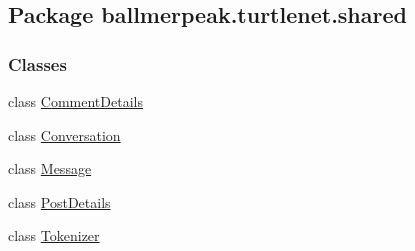 \hypertarget{namespaceballmerpeak_1_1turtlenet_1_1shared}{\subsection{Package ballmerpeak.\-turtlenet.\-shared}
\label{namespaceballmerpeak_1_1turtlenet_1_1shared}
}
\subsubsection*{Classes}
\begin{DoxyCompactItemize}
\item 
class \hyperlink{classballmerpeak_1_1turtlenet_1_1shared_1_1CommentDetails}{Comment\-Details}
\item 
class \hyperlink{classballmerpeak_1_1turtlenet_1_1shared_1_1Conversation}{Conversation}
\item 
class \hyperlink{classballmerpeak_1_1turtlenet_1_1shared_1_1Message}{Message}
\item 
class \hyperlink{classballmerpeak_1_1turtlenet_1_1shared_1_1PostDetails}{Post\-Details}
\item 
class \hyperlink{classballmerpeak_1_1turtlenet_1_1shared_1_1Tokenizer}{Tokenizer}
\end{DoxyCompactItemize}
